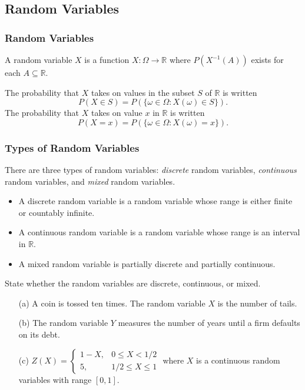 \documentclass{beamer}
\begin{document}
\subsection{Random Variables} 

\begin{frame}
\frametitle{Random Variables}

\begin{Definition}
A random variable $X$ is a function $X:\Omega\to\mathbb{R}$ where $P\left(X^{-1}(A)\right)$ exists for each $A\subseteq\mathbb{R}$.
\end{Definition}

The probability that $X$ takes on values in the subset $S$ of $\mathbb{R}$ is written
$$
P(X\in S) = P\left(\{\omega \in\Omega : X(\omega)\in S\}\right).
$$
The probability that $X$ takes on value $x$ in $\mathbb{R}$ is written
$$
P(X = x) = P\left( \{\omega \in\Omega : X(\omega) = x\} \right).
$$
\end{frame}

\begin{frame}
\frametitle{Types of Random Variables}
There are three types of random variables: {\it discrete} random variables, {\it continuous} random variables, and {\it mixed} random variables. 
\begin{itemize}
\item A discrete random variable is a random variable whose range is either finite or countably infinite. 
\item A continuous random variable is a random variable whose range is an interval in $\mathbb{R}$. 
\item A mixed random variable is partially discrete and partially continuous.
\end{itemize}

\end{frame}

\begin{frame}[t]
\begin{Example}
State whether the random variables are discrete, continuous, or mixed.
\begin{enumerate}
\item[(a)] A coin is tossed ten times. The random variable $X$ is the number of tails.
\item[(b)] The random variable $Y$ measures the number of years until a firm defaults on its debt.
\item[(c)] $Z(X) = \begin{cases} 1 - X, &0\leq X < 1/2\\ 5, 	&1/2\leq X \leq 1\end{cases}$
where $X$ is a continuous random variables with range $[0, 1]$.
\end{enumerate}
\end{Example}

\end{frame}
\end{document}

